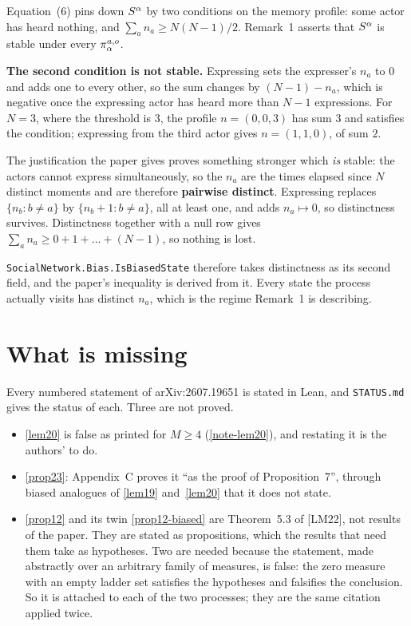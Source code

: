 \begin{remark}
  \label{note-eq6}
  Equation~(6) pins down $S^\alpha$ by two conditions on the memory profile: some
  actor has heard nothing, and $\sum_a n_a \ge N(N-1)/2$.  Remark~1 asserts that
  $S^\alpha$ is stable under every $\pi_\alpha^{a,o}$.

  \textbf{The second condition is not stable.}  Expressing sets the expresser's
  $n_a$ to $0$ and adds one to every other, so the sum changes by
  $(N-1) - n_a$, which is negative once the expressing actor has heard more than
  $N-1$ expressions.  For $N = 3$, where the threshold is $3$, the profile
  $n = (0,0,3)$ has sum $3$ and satisfies the condition; expressing from the
  third actor gives $n = (1,1,0)$, of sum $2$.

  The justification the paper gives proves something stronger which \emph{is}
  stable: the actors cannot express simultaneously, so the $n_a$ are the times
  elapsed since $N$ distinct moments and are therefore \textbf{pairwise
  distinct}.  Expressing replaces $\{n_b : b \ne a\}$ by
  $\{n_b + 1 : b \ne a\}$, all at least one, and adds $n_a \mapsto 0$, so
  distinctness survives.  Distinctness together with a null row gives
  $\sum_a n_a \ge 0 + 1 + \dots + (N-1)$, so nothing is lost.

  \texttt{SocialNetwork.Bias.IsBiasedState} therefore takes distinctness as its
  second field, and the paper's inequality is derived from it.  Every state the
  process actually visits has distinct $n_a$, which is the regime Remark~1 is
  describing.
\end{remark}

\section{What is missing}
\label{sec:missing}

Every numbered statement of arXiv:2607.19651 is stated in Lean, and
\texttt{STATUS.md} gives the status of each.  Three are not proved.

\begin{itemize}
  \item \ref{lem20} is false as printed for $M \ge 4$ (\ref{note-lem20}), and
    restating it is the authors' to do.
  \item \ref{prop23}: Appendix~C proves it ``as the proof of Proposition~7'',
    through biased analogues of \ref{lem19} and~\ref{lem20} that it does not
    state.
  \item \ref{prop12} and its twin \ref{prop12-biased} are Theorem~5.3 of
    [LM22], not results of the paper.  They are stated as propositions, which
    the results that need them take as hypotheses.  Two are needed because the
    statement, made abstractly over an arbitrary family of measures, is false:
    the zero measure with an empty ladder set satisfies the hypotheses and
    falsifies the conclusion.  So it is attached to each of the two processes;
    they are the same citation applied twice.
\end{itemize}

